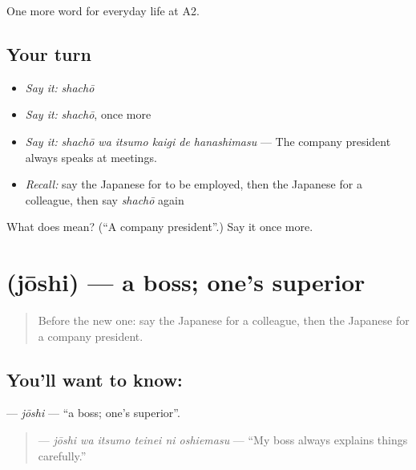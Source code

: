 \begin{grammarlens}[title={What you've built}]
One more word for everyday life at A2.
\end{grammarlens}

\subsection*{Your turn}
\begin{itemize}
\raggedright
  \item \emph{Say it:} \emph{shachō}
  \item \emph{Say it:} \emph{shachō}, once more
  \item \emph{Say it:} \emph{shachō wa itsumo kaigi de hanashimasu} — The company president always speaks at meetings.
  \item \emph{Recall:} say the Japanese for to be employed, then the Japanese for a colleague, then say \emph{shachō} again
\end{itemize}

\begin{tcolorbox}[breakable,colback=teal!4,colframe=teal!35!black,title={Before you move on}]
What does  mean? (\textquotedblleft{}A company president\textquotedblright{}.) Say it once more.
\end{tcolorbox}
\section[\texorpdfstring{\ja{じょうし} (jōshi)}{じょうし (jōshi)}]{ (jōshi) — a boss; one's superior}

\label{lesson:JA-C230-joushi}



\begin{quote}
Before the new one: say the Japanese for a colleague, then the Japanese for a company president.
\end{quote}

\subsection*{You'll want to know: }
\textbf{} — \emph{jōshi} — \textquotedblleft{}a boss; one's superior\textquotedblright{}.

\begin{quote}
\textbf{   } — \emph{jōshi wa itsumo teinei ni oshiemasu} — \textquotedblleft{}My boss always explains things carefully.\textquotedblright{}
\end{quote}

